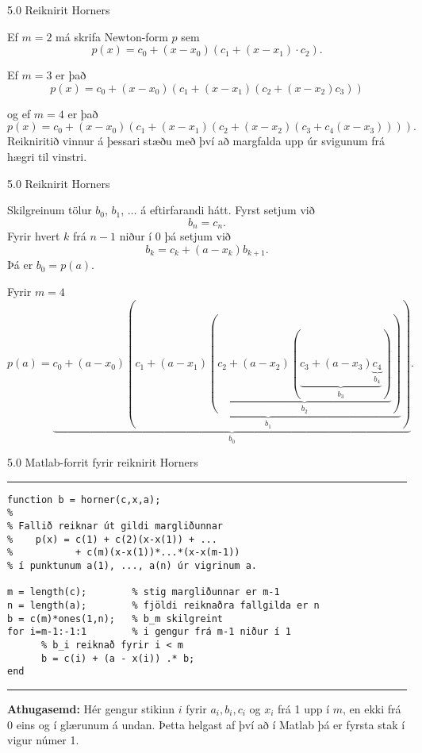 \begin{frame}{5.0 Reiknirit Horners} 

Ef $m = 2$ má skrifa Newton-form $p$ sem
\begin{equation*}
	p(x) = c_0 + (x-x_0)(c_1 + (x-x_1) \cdot c_2).
\end{equation*}

\pause
Ef $m = 3$ er það
\begin{equation*}
	p(x) = c_0 + (x-x_0)(c_1 + (x-x_1)(c_2 + (x-x_2)c_3))
\end{equation*}

\pause
og ef $m = 4$ er það
\begin{equation*}
	p(x) = c_0 + (x-x_0)(c_1 + (x-x_1)(c_2 + (x-x_2)
	(c_3 + c_4(x-x_3)))).
\end{equation*}
Reikniritið vinnur á þessari stæðu með því að margfalda upp úr
svigunum frá hægri til vinstri. 
\end{frame}

\begin{frame}{5.0 Reiknirit Horners} 

Skilgreinum tölur $b_0$, $b_1$, $\ldots$ á eftirfarandi hátt.
Fyrst setjum við 
$$b_n = c_n.$$
Fyrir hvert $k$ frá $n-1$ niður í 0 þá setjum við
\[
	b_k = c_k + (a - x_k) b_{k+1}.
\]
\pause
Þá er $b_0 = p(a)$. 

\medskip
\pause

\begin{block}{Fyrir $m=4$}
 \begin{equation*}
	p(a) = 
	\underbrace{
	  c_0 + (a-x_0)(
	  \underbrace{
	    c_1 + (a-x_1)(
	      \underbrace{c_2 + (a-x_2)(
		\underbrace{c_3 + (a-x_3)
		  \underbrace{c_4}_{b_4}
	      }_{b_3})
	    }_{b_2})
	  }_{b_1})
	}_{b_0}.
\end{equation*}
\end{block}

\end{frame}

\begin{frame}[fragile]{5.0 Matlab-forrit fyrir reiknirit Horners} 
\hrule
\begin{verbatim}
function b = horner(c,x,a); 
%  
% Fallið reiknar út gildi margliðunnar 
%    p(x) = c(1) + c(2)(x-x(1)) + ... 
%           + c(m)(x-x(1))*...*(x-x(m-1)) 
% í punktunum a(1), ..., a(n) úr vigrinum a. 

m = length(c);        % stig margliðunnar er m-1  
n = length(a);        % fjöldi reiknaðra fallgilda er n
b = c(m)*ones(1,n);   % b_m skilgreint
for i=m-1:-1:1        % i gengur frá m-1 niður í 1
      % b_i reiknað fyrir i < m
      b = c(i) + (a - x(i)) .* b; 
end 
\end{verbatim}
\hrule

\pause
\textbf{Athugasemd:} Hér gengur stikinn $i$ fyrir $a_i, b_i, c_i$ og $x_i$ frá 1 upp í $m$, en
ekki frá 0 eins og í glærunum á undan. Þetta helgast af því að í Matlab þá er fyrsta stak í vigur 
númer 1. 
\end{frame}

